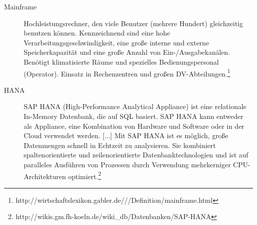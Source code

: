 \begin{description}
        \item[Mainframe] Hochleistungsrechner, den viele Benutzer (mehrere Hundert) gleichzeitig benutzen können. Kennzeichnend sind eine hohe Verarbeitungsgeschwindigkeit, eine große interne und externe Speicherkapazität und eine große Anzahl von Ein-/Ausgabekanälen. Benötigt klimatisierte Räume und spezielles Bedienungspersonal (Operator). Einsatz in Rechenzentren und großen DV-Abteilungen.\footnote{http://wirtschaftslexikon.gabler.de///Definition/mainframe.html}

        \item[HANA] SAP HANA (High-Performance Analytical Appliance) ist eine relationale In-Memory Datenbank, die auf SQL basiert. SAP HANA kann entweder als Appliance, eine Kombination von Hardware und Software oder in der Cloud verwendet werden. [...] Mit SAP HANA ist es möglich, große Datenmengen schnell in Echtzeit zu analysieren. Sie kombiniert spaltenorientierte und zeilenorientierte Datenbanktechnologien und ist auf paralleles Ausführen von Prozessen durch Verwendung mehrkerniger CPU-Architekturen optimiert.\footnote{http://wikis.gm.fh-koeln.de/wiki\_db/Datenbanken/SAP-HANA}

    \end{description} 

